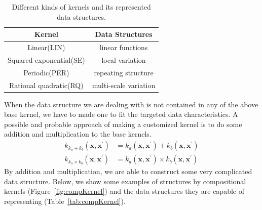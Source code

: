 \begin{table}[htp]
\centering
{\small
\begin{tabular}{c|c}
    \hline
    \textbf{Kernel} & \textbf{Data Structures} \\ 
    \hline
	   Linear(LIN) & linear functions\\
	   Squared exponential(SE) & local variation\\
	   Periodic(PER) & repeating structure\\
	   Rational quadratic(RQ) & multi-scale variation\\
	   \hline
\end{tabular}
}
\vspace{-0.1in}
\caption{Different kinds of kernels and its represented data structures.}
\label{tab:kernel}
\end{table}



When the data structure we are dealing with is not contained in any of the above base kernel, we have to made one to fit the targeted data characteristics. A possible and probable approach of making a customized kernel is to do some addition and multiplication to the base kernels.
\begin{align}
k_{k_{a} + k_{b}} (\textbf{x}, \textbf{x}^{'}) &= k_{a} (\textbf{x}, \textbf{x}^{'}) + k_{b} (\textbf{x}, \textbf{x}^{'}) \\
k_{k_{a} \times k_{b}} (\textbf{x}, \textbf{x}^{'}) &= k_{a} (\textbf{x}, \textbf{x}^{'}) \times k_{b} (\textbf{x}, \textbf{x}^{'})
\end{align}
By addition and multiplication, we are able to construct some very complicated data structure.
Below, we show some examples of structures by compositional kernels (Figure~\ref{fig:compKernel}) and the data structures they are capable of representing (Table~\ref{tab:compKernel}).


